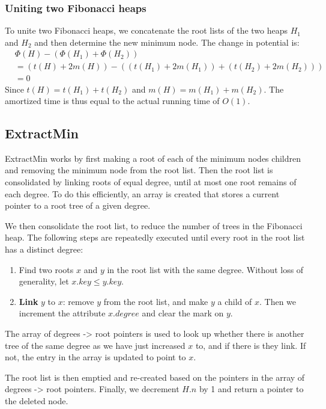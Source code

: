 \subsubsection{Uniting two Fibonacci heaps}
To unite two Fibonacci heaps, we concatenate the root lists of the two heaps
$H_1$ and $H_2$ and then determine the new minimum node. The change in
potential is:
\begin{align*}
	& \Phi(H) - (\Phi(H_1) + \Phi(H_2)) \\
	&= (t(H)+2m(H)) - ((t(H_1)+2m(H_1)) + (t(H_2)+2m(H_2))) \\
	&= 0
\end{align*}
Since $t(H) = t(H_1) + t(H_2)$ and $m(H) = m(H_1)+m(H_2)$. The amortized time
is thus equal to the actual running time of $O(1)$.

\subsection{ExtractMin}
ExtractMin works by first making a root of each of the minimum nodes children
and removing the minimum node from the root list. Then the root list is
consolidated by linking roots of equal degree, until at most one root remains
of each degree. To do this efficiently, an array is created that stores
a current pointer to a root tree of a given degree.

We then consolidate the root list, to reduce the number of trees in the
Fibonacci heap. The following steps are repeatedly executed until every root
in the root list has a distinct degree:
%
\begin{enumerate}
	\item Find two roots $x$ and $y$ in the root list with the same degree. Without loss of generality, let $x.key \leq y.key$.
	\item \textbf{Link} $y$ to $x$: remove $y$ from the root list,
	and make $y$ a child of $x$. Then we increment the attribute
	$x.degree$ and clear the mark on $y$.
\end{enumerate}

The array of degrees -> root pointers is used to look up whether there
is another tree of the same degree as we have just increased $x$ to,
and if there is they link. If not, the entry in the array is updated
to point to $x$.

The root list is then emptied and re-created based on the
pointers in the array of degrees -> root pointers. Finally,
we decrement $H.n$ by 1 and return a pointer to the deleted node.

